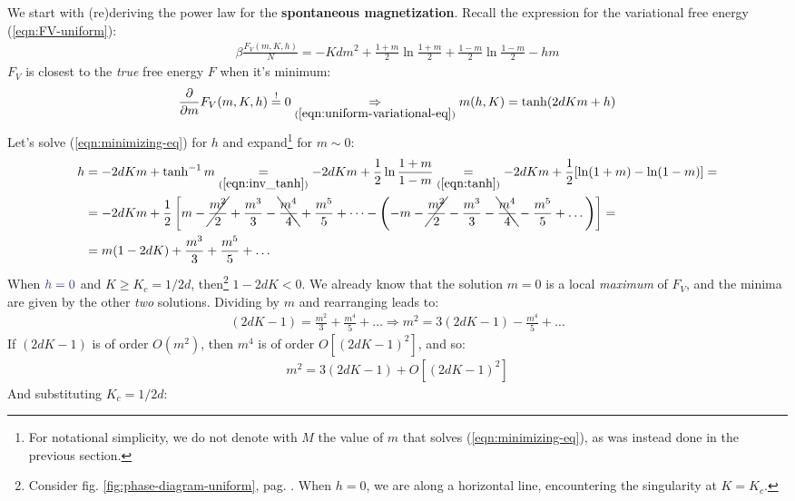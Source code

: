 \documentclass[../../main.tex]{subfiles}
\begin{document}
We start with (re)deriving the power law for the \textbf{spontaneous magnetization}. Recall the expression for the variational free energy (\ref{eqn:FV-uniform}):
\begin{align}
    \beta \frac{F_V(m,K,h)}{N} = - K d m^2 + \frac{1+m}{2} \ln \frac{1+m}{2} + \frac{1-m}{2} \ln \frac{1-m}{2} - hm   
\end{align}
$F_V$ is closest to the \textit{true}  free energy $F$ when it's minimum:
\begin{align}\label{eqn:minimizing-eq}
    \pdv{m} F_V(m, K, h) \overset{!}{=} 0 \underset{(\ref{eqn:uniform-variational-eq})}{\Rightarrow}  m(h,K) = \tanh(2d K m + h)
\end{align} 
Let's solve (\ref{eqn:minimizing-eq}) for $h$ and expand\footnote{For notational simplicity, we do not denote with $M$ the value of $m$ that solves (\ref{eqn:minimizing-eq}), as was instead done in the previous section.} for $m \sim 0$:
\begin{align}\nonumber
    h &= -2dKm + \tanh^{-1}m  \underset{(\ref{eqn:inv_tanh})}{=} -2dKm + \frac{1}{2} \ln \frac{1+m}{1-m} \underset{(\ref{eqn:tanh})}{=} -2dKm + \frac{1}{2}[\ln(1+m) - \ln(1-m)] =\\ \nonumber
    &= -2dKm +\frac{1}{2}\left[m-\cancel{\frac{m^2}{2}}+\frac{m^3}{3}-\bcancel{\frac{m^4}{4}}+\frac{m^5}{5}+\dots  - \left(-m -\cancel{\frac{m^2}{2}} -\frac{m^3}{3} -\bcancel{\frac{m^4}{4} }-\frac{m^5}{5} + \dots    \right) \right] =\\
    &= m(1-2dK) + \frac{m^3}{3} + \frac{m^5}{5} + \dots  \label{eqn:h-eq} 
\end{align}
When $\textcolor{Blue}{h=0}$ and $K \geq K_c = 1/2d$, then\footnote{Consider fig. \ref{fig:phase-diagram-uniform}, pag. \pageref{fig:phase-diagram-uniform}. When $h=0$, we are  along a horizontal line, encountering the singularity at $K = K_c$.} $1-2dK < 0$. We already know that the solution $m=0$ is a local \textit{maximum} of $F_V$, and the minima are given by the other \textit{two} solutions. Dividing by $m$ and rearranging leads to:
\begin{align*}
    (2dK-1) = \frac{m^2}{3} + \frac{m^4}{5} + \dots \Rightarrow  m^2 = 3(2dK - 1) - \frac{m^4}{5} + \dots
\end{align*}
If $(2dK - 1)$ is of order $O(m^2)$, then $m^4$ is of order $O[(2dK-1)^2]$, and so:
\begin{align*}
    m^2 = 3(2dK-1) + O[(2dK-1)^2]
\end{align*}
And substituting $K_c = 1/2d$:
\end{document}
